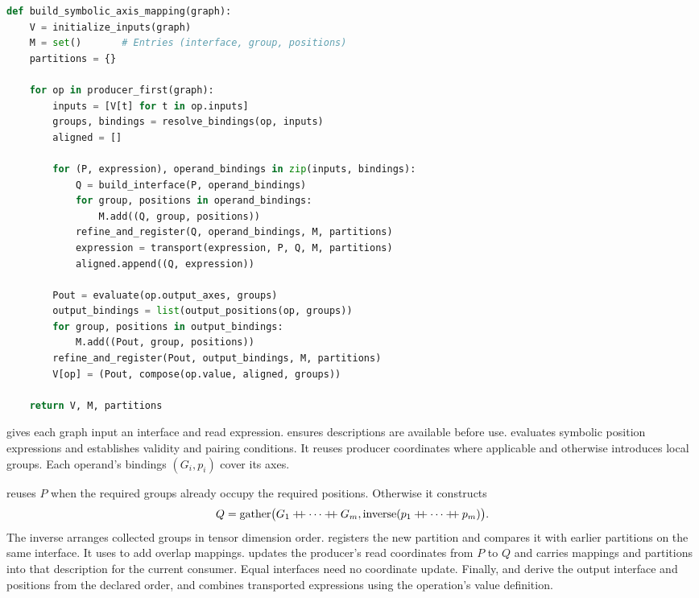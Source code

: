 \begin{paperalgorithm}[H]
\caption{Build symbolic axis mapping.}\label{alg:mapping}
\begin{lstlisting}[language=Python]
def build_symbolic_axis_mapping(graph):
    V = initialize_inputs(graph)
    M = set()       # Entries (interface, group, positions)
    partitions = {}

    for op in producer_first(graph):
        inputs = [V[t] for t in op.inputs]
        groups, bindings = resolve_bindings(op, inputs)
        aligned = []

        for (P, expression), operand_bindings in zip(inputs, bindings):
            Q = build_interface(P, operand_bindings)
            for group, positions in operand_bindings:
                M.add((Q, group, positions))
            refine_and_register(Q, operand_bindings, M, partitions)
            expression = transport(expression, P, Q, M, partitions)
            aligned.append((Q, expression))

        Pout = evaluate(op.output_axes, groups)
        output_bindings = list(output_positions(op, groups))
        for group, positions in output_bindings:
            M.add((Pout, group, positions))
        refine_and_register(Pout, output_bindings, M, partitions)
        V[op] = (Pout, compose(op.value, aligned, groups))

    return V, M, partitions
\end{lstlisting}
\end{paperalgorithm}

 gives each graph input an interface and read
expression.  ensures descriptions are available before
use.  evaluates symbolic position expressions and
establishes validity and pairing conditions. It reuses producer coordinates
where applicable and otherwise introduces local groups. Each operand's
bindings $(G_i,p_i)$ cover its axes.

 reuses $P$ when the required groups already occupy the
required positions. Otherwise it constructs
\begin{equation}
 Q=\gath\bigl(G_1\catseq\cdots\catseq G_m,
        \operatorname{inverse}(p_1\catseq\cdots\catseq p_m)\bigr).
\end{equation}
The inverse arranges collected groups in tensor dimension order.
 registers the new partition and compares it
with earlier partitions on the same interface. It uses 
to add overlap mappings.  updates the producer's read
coordinates from $P$ to $Q$ and carries mappings and partitions into that
description for the current consumer. Equal interfaces need no coordinate
update. Finally,  and  derive the
output interface and positions from the declared order, and 
combines transported expressions using the operation's value definition.

